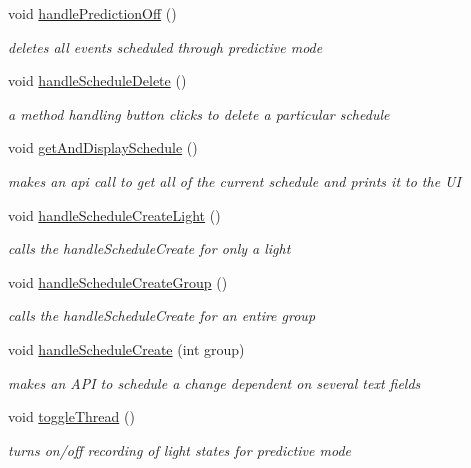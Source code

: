 \begin{DoxyCompactItemize}
void \hyperlink{class_home_page_af6d8f0979312ab9971c4c696992f5096}{handle\+Prediction\+Off} ()
\begin{DoxyCompactList}\small\item\em deletes all events scheduled through predictive mode \end{DoxyCompactList}\item 
void \hyperlink{class_home_page_af449cf14bc9d0196e0cb4a4c352b3919}{handle\+Schedule\+Delete} ()
\begin{DoxyCompactList}\small\item\em a method handling button clicks to delete a particular schedule \end{DoxyCompactList}\item 
void \hyperlink{class_home_page_a1ee49731ce9e0ae4ce8525cd86c800f8}{get\+And\+Display\+Schedule} ()
\begin{DoxyCompactList}\small\item\em makes an api call to get all of the current schedule and prints it to the UI \end{DoxyCompactList}\item 
void \hyperlink{class_home_page_a90f36d7359af291e1becf350c7805768}{handle\+Schedule\+Create\+Light} ()
\begin{DoxyCompactList}\small\item\em calls the handle\+Schedule\+Create for only a light \end{DoxyCompactList}\item 
void \hyperlink{class_home_page_a2e1ef1f628cf82023a688fabfc272bff}{handle\+Schedule\+Create\+Group} ()
\begin{DoxyCompactList}\small\item\em calls the handle\+Schedule\+Create for an entire group \end{DoxyCompactList}\item 
void \hyperlink{class_home_page_ad43b3bb765e485771e9116edbcec0b2b}{handle\+Schedule\+Create} (int group)
\begin{DoxyCompactList}\small\item\em makes an A\+PI to schedule a change dependent on several text fields \end{DoxyCompactList}\item 
void \hyperlink{class_home_page_a8c56067a3cd4dc321572a034d3135ab9}{toggle\+Thread} ()
\begin{DoxyCompactList}\small\item\em turns on/off recording of light states for predictive mode \end{DoxyCompactList}\end{DoxyCompactItemize}
